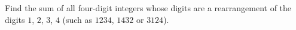 Find the sum of all four-digit integers whose digits are a rearrangement of the digits $1$, $2$, $3$, $4$ (such as $1234$, $1432$ or $3124$).
